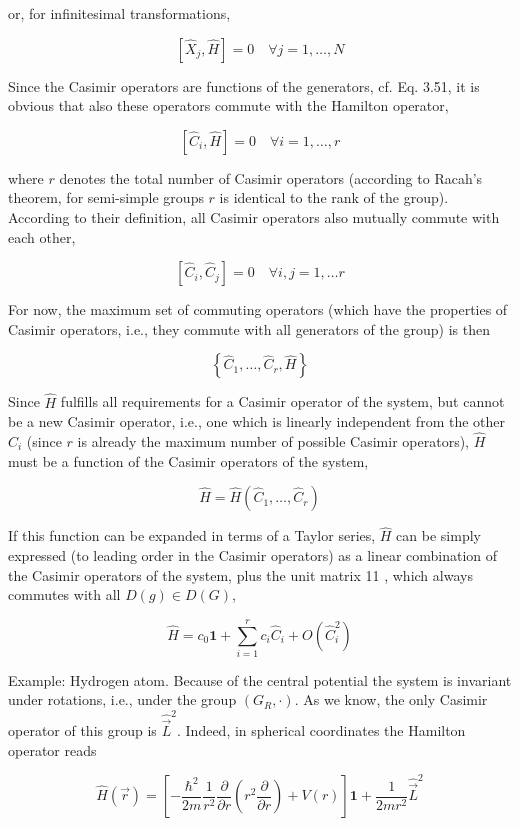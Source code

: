 \documentclass[10pt, letterpaper]{article}
\begin{document}
or, for infinitesimal transformations,

$$
\left[\hat{X}_{j}, \hat{H}\right]=0 \quad \forall j=1, \ldots, N
$$

Since the Casimir operators are functions of the generators, cf. Eq. 3.51, it is obvious that also these operators commute with the Hamilton operator,

$$
\left[\hat{C}_{i}, \hat{H}\right]=0 \quad \forall i=1, \ldots, r
$$

where $r$ denotes the total number of Casimir operators (according to Racah's theorem, for semi-simple groups $r$ is identical to the rank of the group). According to their definition, all Casimir operators also mutually commute with each other,

$$
\left[\hat{C}_{i}, \hat{C}_{j}\right]=0 \quad \forall i, j=1, \ldots r
$$

For now, the maximum set of commuting operators (which have the properties of Casimir operators, i.e., they commute with all generators of the group) is then

$$
\left\{\hat{C}_{1}, \ldots, \hat{C}_{r}, \hat{H}\right\}
$$

Since $\hat{H}$ fulfills all requirements for a Casimir operator of the system, but cannot be a new Casimir operator, i.e., one which is linearly independent from the other $\hat{C}_{i}$ (since $r$ is already the maximum number of possible Casimir operators), $\hat{H}$ must be a function of the Casimir operators of the system,

$$
\hat{H}=\hat{H}\left(\hat{C}_{1}, \ldots, \hat{C}_{r}\right)
$$

If this function can be expanded in terms of a Taylor series, $\hat{H}$ can be simply expressed (to leading order in the Casimir operators) as a linear combination of the Casimir operators of the system, plus the unit matrix 11 , which always commutes with all $D(g) \in D(G)$,

$$
\hat{H}=c_{0} \mathbf{1}+\sum_{i=1}^{r} c_{i} \hat{C}_{i}+O\left(\hat{C}_{i}^{2}\right)
$$

Example: Hydrogen atom. Because of the central potential the system is invariant under rotations, i.e., under the group $\left(G_{R}, \cdot\right)$. As we know, the only Casimir operator of this group is $\hat{\vec{L}}^{2}$. Indeed, in spherical coordinates the Hamilton operator reads

$$
\hat{H}(\vec{r})=\left[-\frac{\hbar^{2}}{2 m} \frac{1}{r^{2}} \frac{\partial}{\partial r}\left(r^{2} \frac{\partial}{\partial r}\right)+V(r)\right] \mathbf{1}+\frac{1}{2 m r^{2}} \hat{\vec{L}}^{2}
$$
\end{document}
